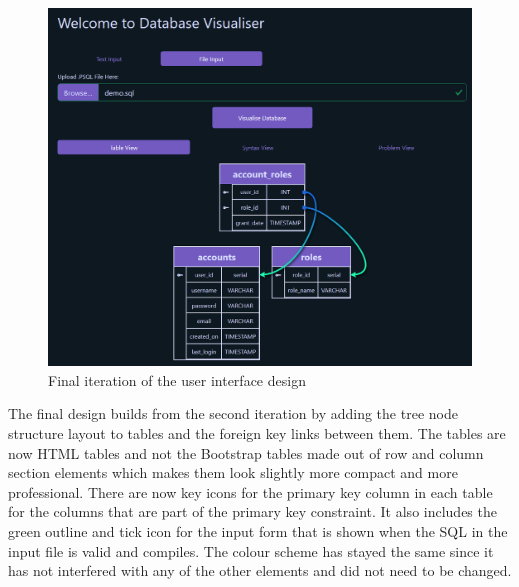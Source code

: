 \begin{figure}[h!]
	\centering
	\includegraphics[width=\textwidth]{finalDesign}
	\caption{Final iteration of the user interface design}
	\label{fig:finalDesign}
\end{figure}

The final design builds from the second iteration by adding the tree node structure layout to tables and the foreign key links between them. The tables are now HTML tables and not the Bootstrap tables made out of row and column section elements which makes them look slightly more compact and more professional. There are now key icons for the primary key column in each table for the columns that are part of the primary key constraint. It also includes the green outline and tick icon for the input form that is shown when the SQL in the input file is valid and compiles. The colour scheme has stayed the same since it has not interfered with any of the other elements and did not need to be changed. 